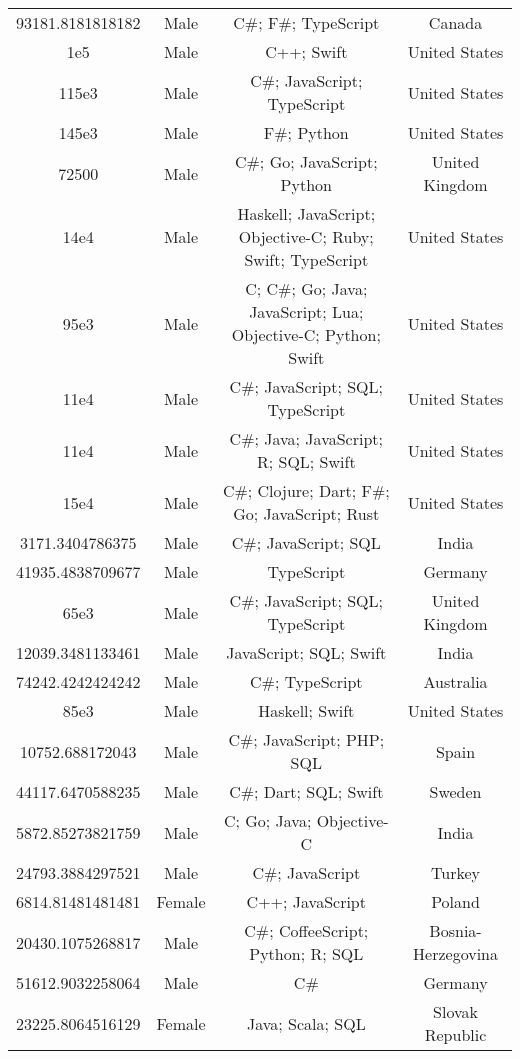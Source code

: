 \begin{center}
\begin{tabular}{ |c|c|c|c| }
93181.8181818182  &  Male  &  C\#; F\#; TypeScript  &  Canada  \\ 
1e5  &  Male  &  C++; Swift  &  United States  \\ 
115e3  &  Male  &  C\#; JavaScript; TypeScript  &  United States  \\ 
145e3  &  Male  &  F\#; Python  &  United States  \\ 
72500  &  Male  &  C\#; Go; JavaScript; Python  &  United Kingdom  \\ 
14e4  &  Male  &  Haskell; JavaScript; Objective-C; Ruby; Swift; TypeScript  &  United States  \\ 
95e3  &  Male  &  C; C\#; Go; Java; JavaScript; Lua; Objective-C; Python; Swift  &  United States  \\ 
11e4  &  Male  &  C\#; JavaScript; SQL; TypeScript  &  United States  \\ 
11e4  &  Male  &  C\#; Java; JavaScript; R; SQL; Swift  &  United States  \\ 
15e4  &  Male  &  C\#; Clojure; Dart; F\#; Go; JavaScript; Rust  &  United States  \\ 
3171.3404786375  &  Male  &  C\#; JavaScript; SQL  &  India  \\ 
41935.4838709677  &  Male  &  TypeScript  &  Germany  \\ 
65e3  &  Male  &  C\#; JavaScript; SQL; TypeScript  &  United Kingdom  \\ 
12039.3481133461  &  Male  &  JavaScript; SQL; Swift  &  India  \\ 
74242.4242424242  &  Male  &  C\#; TypeScript  &  Australia  \\ 
85e3  &  Male  &  Haskell; Swift  &  United States  \\ 
10752.688172043  &  Male  &  C\#; JavaScript; PHP; SQL  &  Spain  \\ 
44117.6470588235  &  Male  &  C\#; Dart; SQL; Swift  &  Sweden  \\ 
5872.85273821759  &  Male  &  C; Go; Java; Objective-C  &  India  \\ 
24793.3884297521  &  Male  &  C\#; JavaScript  &  Turkey  \\ 
6814.81481481481  &  Female  &  C++; JavaScript  &  Poland  \\ 
20430.1075268817  &  Male  &  C\#; CoffeeScript; Python; R; SQL  &  Bosnia-Herzegovina  \\ 
51612.9032258064  &  Male  &  C\#  &  Germany  \\ 
23225.8064516129  &  Female  &  Java; Scala; SQL  &  Slovak Republic  \\ 

\end{tabular}
\end{center}
